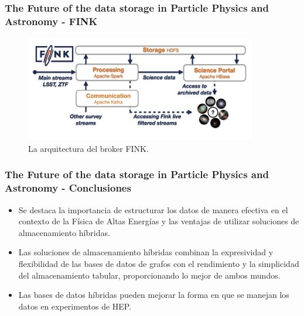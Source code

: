 \begin{frame}
    \frametitle{The Future of the data storage in Particle Physics and Astronomy - FINK}

   \begin{figure}[H]
        \centering
        \includegraphics[width=0.9\textwidth]{images/multidb-2.png}
        \caption{La arquitectura del broker FINK.}
        \label{multidb-2}
    \end{figure}
    
\end{frame}

\begin{frame}
    \frametitle{The Future of the data storage in Particle Physics and Astronomy - Conclusiones}

    \begin{itemize}
        \item Se destaca la importancia de estructurar los datos de manera efectiva en el contexto de la Física de Altas Energías y las ventajas de utilizar soluciones de almacenamiento híbridas.

         
        
        \item Las soluciones de almacenamiento híbridas combinan la expresividad y flexibilidad de las bases de datos de grafos con el rendimiento y la simplicidad del almacenamiento tabular, proporcionando lo mejor de ambos mundos.

         

        \item Las bases de datos híbridas pueden mejorar la forma en que se manejan los datos en experimentos de HEP.
    \end{itemize}
    
\end{frame}